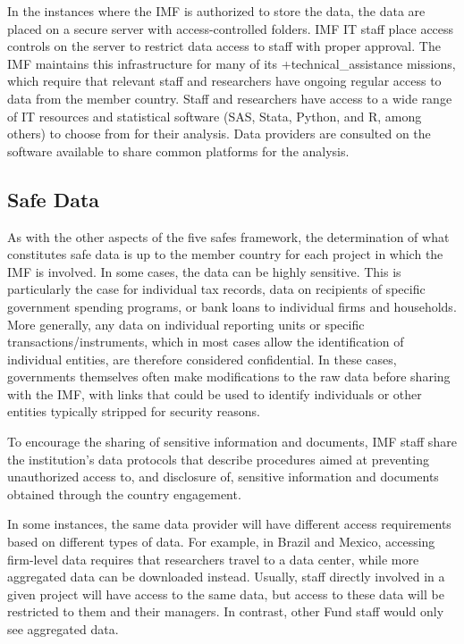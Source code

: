 \documentclass[
]{book}
\begin{document}
In the instances where the IMF is authorized to store the data, the data are placed on a secure server with access-controlled folders. IMF IT staff place access controls on the server to restrict data access to staff with proper approval. The IMF maintains this infrastructure for many of its +technical\_assistance\textbar{} missions, which require that relevant staff and researchers have ongoing regular access to data from the member country. Staff and researchers have access to a wide range of IT resources and statistical software (SAS, Stata, Python, and R, among others) to choose from for their analysis. Data providers are consulted on the software available to share common platforms for the analysis.

\hypertarget{safe-data-8}{%
\subsection{Safe Data}\label{safe-data-8}}

As with the other aspects of the five safes framework, the determination of what constitutes safe data is up to the member country for each project in which the IMF is involved. In some cases, the data can be highly sensitive. This is particularly the case for individual tax records, data on recipients of specific government spending programs, or bank loans to individual firms and households. More generally, any data on individual reporting units or specific transactions/instruments, which in most cases allow the identification of individual entities, are therefore considered confidential. In these cases, governments themselves often make modifications to the raw data before sharing with the IMF, with links that could be used to identify individuals or other entities typically stripped for security reasons.

To encourage the sharing of sensitive information and documents, IMF staff share the institution's data protocols that describe procedures aimed at preventing unauthorized access to, and disclosure of, sensitive information and documents obtained through the country engagement.

In some instances, the same data provider will have different access requirements based on different types of data. For example, in Brazil and Mexico, accessing firm-level data requires that researchers travel to a data center, while more aggregated data can be downloaded instead. Usually, staff directly involved in a given project will have access to the same data, but access to these data will be restricted to them and their managers. In contrast, other Fund staff would only see aggregated data.
\end{document}
